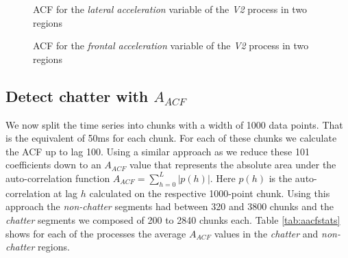 \documentclass[12 pt]{scrartcl}
\begin{document}
\begin{figure}[p]
  \caption{ACF for the \emph{lateral acceleration} variable of the \emph{V2} process in two regions}
  \label{fig:v2-lateral-acfs}
\end{figure}


\begin{figure}[p]
  \caption{ACF for the \emph{frontal acceleration} variable of the \emph{V2} process in two regions}
  \label{fig:v2-frontal-acfs}
\end{figure}

\subsection{Detect chatter with $A_{ACF}$}

We now split the time series into chunks with a width of 1000 data points. That is the equivalent of 50ms for each chunk. For each of these chunks we calculate the ACF up to lag 100.
Using a similar approach as \citet{deistler2022time} we reduce these 101 coefficients down to an $A_{ACF}$ value that represents the absolute area under the auto-correlation function $A_{ACF} = \sum^{L}_{h=0}{|p(h)|}$.
Here $p(h)$ is the auto-correlation at lag $h$ calculated on the respective 1000-point chunk. Using this approach the \emph{non-chatter} segments had between 320 and 3800 chunks and the \emph{chatter} segments we composed of 200 to 2840 chunks each. Table \ref{tab:aacfstats} shows for each of the processes the average $A_{ACF}$ values in the \emph{chatter} and \emph{non-chatter} regions.
\end{document}
